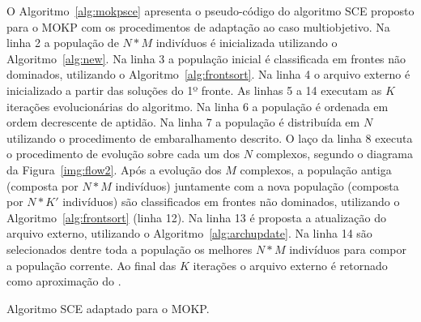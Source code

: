 O Algoritmo~\ref{alg:mokpsce} apresenta o pseudo-código do algoritmo SCE
proposto para o MOKP com os procedimentos de adaptação ao caso multiobjetivo.
Na linha 2 a população de $N*M$ indivíduos é inicializada utilizando o 
Algoritmo~\ref{alg:new}.
Na linha 3 a população inicial é classificada em frontes não dominados, utilizando
o Algoritmo~\ref{alg:frontsort}.
Na linha 4
o arquivo externo é inicializado a partir das soluções do 1º fronte.
As linhas 5 a 14 executam as $K$ iterações evolucionárias do algoritmo.
Na linha 6 a população é ordenada em ordem decrescente de aptidão.
Na linha 7 a população é distribuída em $N$ utilizando o procedimento de embaralhamento descrito.
O laço da linha 8 executa o procedimento de evolução sobre cada um dos $N$ complexos,
segundo o diagrama da Figura~\ref{img:flow2}.
Após a evolução dos $M$ complexos, a população antiga (composta por $N*M$ indivíduos)
juntamente com a nova população (composta por $N*K'$ indivíduos) são classificados em frontes
não dominados, utilizando o Algoritmo~\ref{alg:frontsort} (linha 12).
Na linha 13 é proposta a atualização do arquivo externo, utilizando o Algoritmo~\ref{alg:archupdate}.
Na linha 14 são selecionados dentre toda a população os melhores $N*M$ indivíduos para compor a população corrente.
Ao final das $K$ iterações o arquivo externo é retornado como aproximação do \paretoset{}.


\begin{algorithm}
  \footnotesize
  
  \caption{Algoritmo SCE adaptado para o MOKP.}
  \label{alg:mokpsce}
\end{algorithm}

